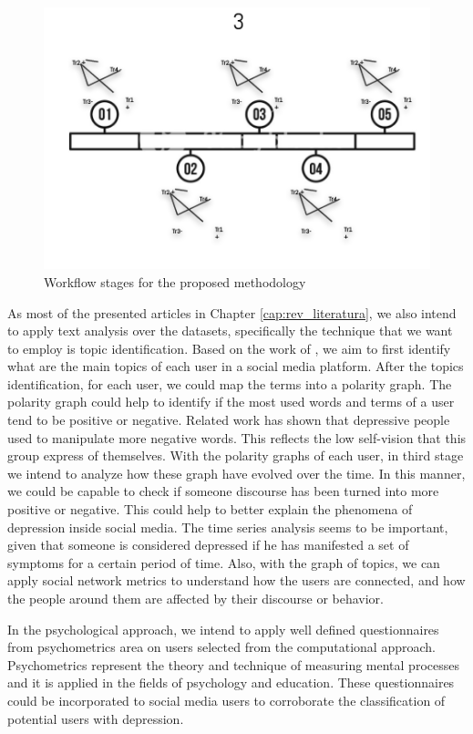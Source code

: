 \begin{figure}[!h]
    \includegraphics[scale=.6]{figs/method_3.png}
    \caption{Workflow stages for the proposed methodology}
    \label{fig:my_label}
\end{figure}

As most of the presented articles in Chapter \ref{cap:rev_literatura}, we also intend to apply text analysis over the datasets, specifically the technique that we want to employ is topic identification. Based on the work of \cite{Nolasco2016}, we aim to first identify what are the main topics of each user in a social media platform. 
After the topics identification, for each user, we could map the terms into a polarity graph. 
The polarity graph could help to identify if the most used words and terms of a user tend to be positive or negative. Related work has shown that depressive people used to manipulate more negative words. This reflects the low self-vision that this group express of themselves.
With the polarity graphs of each user, in third stage we intend to analyze how these graph have evolved over the time. In this manner, we could be capable to check if someone discourse has been turned into more positive or negative.
This could help to better explain the phenomena of depression inside social media. The time series analysis seems to be important, given that someone is considered depressed if he has manifested a set of symptoms for a certain period of time.
Also, with the graph of topics, we can apply social network metrics to understand how the users are connected, and how the people around them are affected by their discourse or behavior.

In the psychological approach, we intend to apply well defined questionnaires from psychometrics area on users selected from the computational approach. 
Psychometrics represent the theory and technique of measuring mental processes and it is applied in the fields of psychology and education. These questionnaires could be incorporated to social media users to corroborate the classification of potential users with depression.

